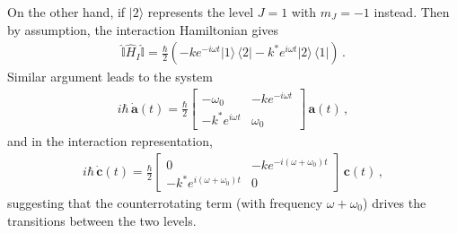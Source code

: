 \documentclass[11pt, oneside]{book}
\theoremstyle{break}
\theoremstyle{break}
\newcommand{\bmat}[1]{\begin{bmatrix} #1 \end{bmatrix}}
\begin{document}
On the other hand, if $|2\rangle$ represents the level $J=1$ with $m_J = -1$ instead. Then by assumption, the interaction Hamiltonian gives
\begin{align*}
\hat{\mathbb{I}}\hat{H}_I \hat{\mathbb{I}} = \frac{\hbar}{2}\left( -ke^{-i \omega t}|1\rangle \, \langle 2| - k^* e^{i\omega t} |2\rangle\,\langle 1|\right)\,.
\end{align*}
Similar argument leads to the system
\begin{align*}
i\hbar\, \dot{\mathbf{a}}(t) = \frac{\hbar}{2}\bmat{-\omega_0 & -ke^{-i\omega t} \\ -k^* e^{i\omega t} & \omega_0}\, \mathbf{a}(t)\,,
\end{align*}
and in the interaction representation, 
\begin{align*}
i\hbar\, \dot{\mathbf{c}}(t) = \frac{\hbar}{2}\bmat{0 & -ke^{-i(\omega+\omega_0) t} \\ -k^* e^{i(\omega+\omega_0) t} & 0}\, \mathbf{c}(t)\,,
\end{align*}
suggesting that the counterrotating term (with frequency $\omega+\omega_0$) drives the transitions between the two levels. 
\end{document}
